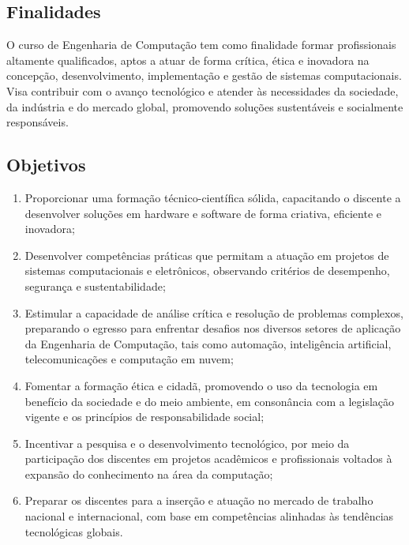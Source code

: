 \subsection{Finalidades}

O curso de Engenharia de Computação tem como finalidade formar profissionais altamente qualificados, aptos a atuar de forma crítica, ética e inovadora na concepção, desenvolvimento, implementação e gestão de sistemas computacionais. Visa contribuir com o avanço tecnológico e atender às necessidades da sociedade, da indústria e do mercado global, promovendo soluções sustentáveis e socialmente responsáveis.

\subsection{Objetivos}

\begin{enumerate}
    \item Proporcionar uma formação técnico-científica sólida, capacitando o discente a desenvolver soluções em hardware e software de forma criativa, eficiente e inovadora;

    \item Desenvolver competências práticas que permitam a atuação em projetos de sistemas computacionais e eletrônicos, observando critérios de desempenho, segurança e sustentabilidade;

    \item Estimular a capacidade de análise crítica e resolução de problemas complexos, preparando o egresso para enfrentar desafios nos diversos setores de aplicação da Engenharia de Computação, tais como automação, inteligência artificial, telecomunicações e computação em nuvem;

    \item Fomentar a formação ética e cidadã, promovendo o uso da tecnologia em benefício da sociedade e do meio ambiente, em consonância com a legislação vigente e os princípios de responsabilidade social;

    \item Incentivar a pesquisa e o desenvolvimento tecnológico, por meio da participação dos discentes em projetos acadêmicos e profissionais voltados à expansão do conhecimento na área da computação;

    \item Preparar os discentes para a inserção e atuação no mercado de trabalho nacional e internacional, com base em competências alinhadas às tendências tecnológicas globais.
\end{enumerate}

